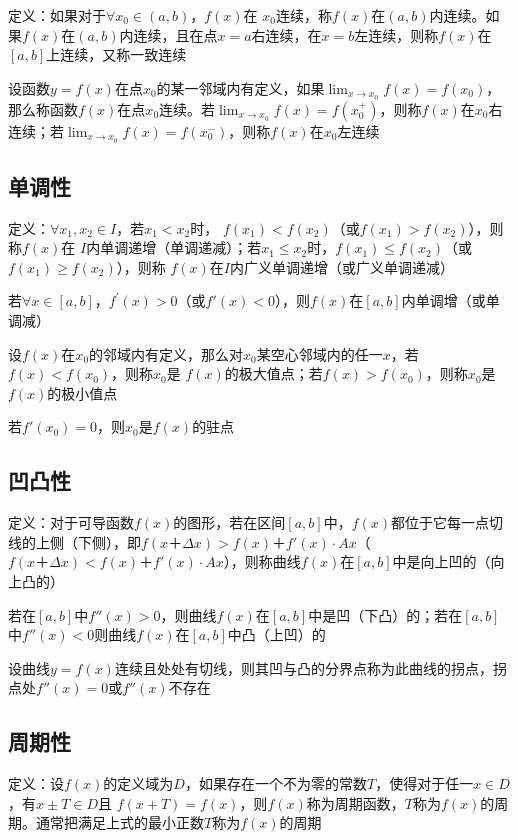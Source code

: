 \documentclass[12pt]{book}
\begin{document}
定义：如果对于$\forall x_0\in (a,b)$，$f(x)$在 $x_0$连续，称$f(x)$在$(a,b)$内连续。如果$f(x)$在$(a,b)$内连续，且在点$x=a$右连续，在$x=b$左连续，则称$f(x)$在$[a,b]$上连续，又称一致连续

设函数$y=f(x)$在点$x_0$的某一邻域内有定义，如果$\lim_{x\rightarrow x_0}{f(x)}= f(x_0)$，那么称函数$f(x)$在点$x_0$连续。若$\lim_{x\rightarrow x_0}{f(x)}= f(x_0^+)$，则称$f(x)$在$x_0$右连续；若$\lim_{x\rightarrow x_0}{f(x)}= f(x_0^-)$，则称$f(x)$在$x_0$左连续

\subsection{单调性}

定义：$\forall x_1, x_2\in I$，若$x_1<x_2$时， $f(x_1)<f(x_2)$（或$f(x_1)>f(x_2)$），则称$f(x)$在 $I$内单调递增（单调递减）；若$x_1\leq x_2$时，$f(x_1)\leq f(x_2)$（或$f(x_1)\geq f(x_2)$），则称 $f(x)$在$I$内广义单调递增（或广义单调递减）

若$\forall x\in[a,b]$，$f^\prime(x)>0$（或$f'(x)<0$），则$f(x)$在$[a,b]$内单调增（或单调减）

设$ f(x)$在$x_0$的邻域内有定义，那么对$x_0$某空心邻域内的任一$x$，若$f(x)< f(x_0)$，则称$x_0$是 $f(x)$的极大值点；若$f(x)> f(x_0)$，则称$x_0$是 $f(x)$的极小值点

若$f'(x_0)=0$，则$x_0$是$f(x)$的驻点

\subsection{凹凸性}

定义：对于可导函数$f(x)$的图形，若在区间$[a,b]$中，$f(x)$都位于它每一点切线的上侧（下侧），即$ f(x＋\Delta x)>f(x)＋f'(x)\cdot A x$（$ f(x＋\Delta x)<f(x)＋f'(x)\cdot A x$），则称曲线$f(x)$在$[a,b]$中是向上凹的（向上凸的）


若在$[a,b]$中$ f''(x)> 0$，则曲线$f(x)$在$[a,b]$中是凹（下凸）的；若在$[a,b]$中$f''(x)<0$则曲线$f(x)$在$[a,b]$中凸（上凹）的

设曲线$y=f(x)$连续且处处有切线，则其凹与凸的分界点称为此曲线的拐点，拐点处$f''(x)=0$或$f''(x)$不存在

\subsection{周期性}

定义：设$f(x)$的定义域为$D$，如果存在一个不为零的常数$T$，使得对于任一$ x \in D$，有$x\pm T\in D$且 $f(x+T)= f(x)$，则$f(x)$称为周期函数，$T$称为$f(x)$的周期。通常把满足上式的最小正数$T$称为$f(x)$的周期
\end{document}
